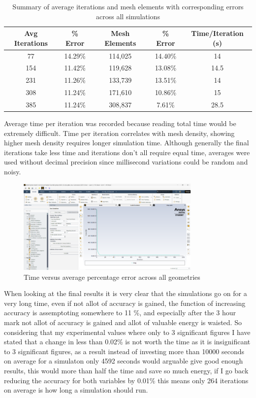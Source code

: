 \documentclass[12pt,a4paper]{article}
\begin{document}
\begin{table}[H]
\centering
\caption{Summary of average iterations and mesh elements with corresponding errors across all simulations}
\label{tab:overall_summary}
\begin{tabular}{|c|c|c|c|c|}
\hline
\rowcolor{lightblue}
\textbf{Avg Iterations} & \textbf{\% Error} & \textbf{Mesh Elements} & \textbf{\% Error} & \textbf{Time/Iteration (s)} \\
\hline
77 & 14.29\% & 114,025 & 14.40\% & 14 \\
\hline
154 & 11.42\% & 119,628 & 13.08\% & 14.5 \\
\hline
231 & 11.26\% & 133,739 & 13.51\% & 14 \\
\hline
308 & 11.24\% & 171,610 & 10.86\% & 15 \\
\hline
385 & 11.24\% & 308,837 & 7.61\% & 28.5 \\
\hline
\end{tabular}
\end{table}

Average time per iteration was recorded because reading total time would be extremely difficult. Time per iteration correlates with mesh density, showing higher mesh density requires longer simulation time. Although generally the final iterations take less time and iterations don't all require equal time, averages were used without decimal precision since millisecond variations could be random and noisy.

\begin{figure}[H]
    \centering
    \includegraphics[width=0.8\textwidth]{image6.png}
    \caption{Time versus average percentage error across all geometries}
    \label{fig:time_vs_error}
\end{figure}

When looking at the final results it is very clear that the simulations go on for a very long time, even if not allot of accuracy is gained, the function of increasing accuracy is assemptoting somewhere to 11 \%, and especially after the 3 hour mark not allot of accuracy is gained and allot of valuable energy is waisted. So considering that my experimental values where only to 3 significant figures I have stated that a change in less than 0.02\% is not worth the time as it is insignificant to 3 significant figures, as a result instead of investing more than 10000 seconds on average for a simulaton only 4592 seconds would arguable give good enough results, this would more than half the time and save so much energy, if I go back reducing the accuracy for both variables by 0.01\% this means only 264 iterations on average is how long a simulation should run.
\end{document}
